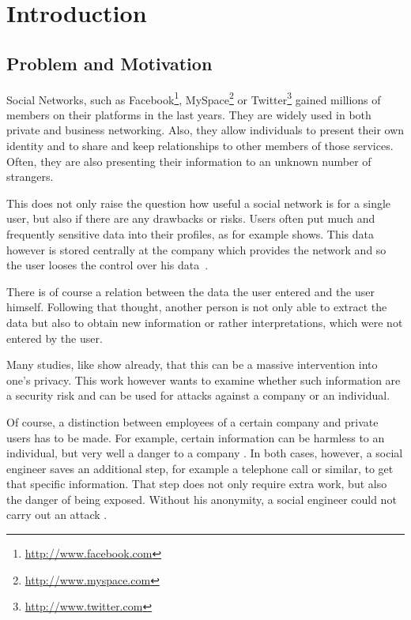 \chapter{Introduction}
\label{chapter:introduction}

\section{Problem and Motivation}

Social Networks, such as Facebook\footnote{\url{http://www.facebook.com}},
MySpace\footnote{\url{http://www.myspace.com}} or
Twitter\footnote{\url{http://www.twitter.com}} gained millions of members on
their platforms in the last years. They are widely used in both private and
business networking. Also, they allow individuals to present their own identity
and to share and keep relationships to other members of those services. Often,
they are also presenting their information to an unknown number of strangers.

This does not only raise the question how useful a social network is for a
single user, but also if there are any drawbacks or risks. Users often put
much and frequently sensitive data into their profiles, as for example
\cite{brown2008} shows. This data however is stored centrally at the company
which provides the network and so the user looses the control over his
data~\cite{fraunhofer2008}.

There is of course a relation between the data the user entered and the user
himself. Following that thought, another person is not only able to extract the
data but also to obtain new information or rather interpretations, which were
not entered by the user.

Many studies, like \cite{fraunhofer2008,gross2005} show already, that this can
be a massive intervention into one's privacy. This work however wants to examine
whether such information are a security risk and can be used for attacks
against a company or an individual.

Of course, a distinction between employees of a certain company and private
users has to be made. For example, certain information can be harmless to an
individual, but very well a danger to a company \cite{mitnick2003}. In both
cases, however, a social engineer saves an additional step, for example a
telephone call or similar, to get that specific information. That step does not
only require extra work, but also the danger of being exposed. Without his
anonymity, a social engineer could not carry out an attack \cite{mitnick2003}.

